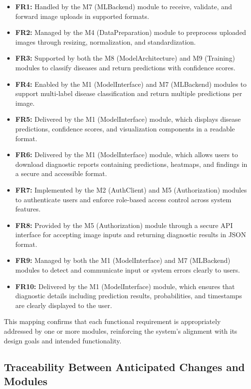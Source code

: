 \documentclass[12pt, titlepage]{article}
\begin{document}
\begin{itemize}
    \item \textbf{FR1:} Handled by the M7 (MLBackend) module to receive, validate, and forward image uploads in supported formats.
    \item \textbf{FR2:} Managed by the M4 (DataPreparation) module to preprocess uploaded images through resizing, normalization, and standardization.
    \item \textbf{FR3:} Supported by both the M8 (ModelArchitecture) and M9 (Training) modules to classify diseases and return predictions with confidence scores.
    \item \textbf{FR4:} Enabled by the M1 (ModelInterface) and M7 (MLBackend) modules to support multi-label disease classification and return multiple predictions per image.
    \item \textbf{FR5:} Delivered by the M1 (ModelInterface) module, which displays disease predictions, confidence scores, and visualization components in a readable format.
    \item \textbf{FR6:} Delivered by the M1 (ModelInterface) module, which allows users to download diagnostic reports containing predictions, heatmaps, and findings in a secure and accessible format.
    \item \textbf{FR7:} Implemented by the M2 (AuthClient) and M5 (Authorization) modules to authenticate users and enforce role-based access control across system features.
    \item \textbf{FR8:} Provided by the M5 (Authorization) module through a secure API interface for accepting image inputs and returning diagnostic results in JSON format.
    \item \textbf{FR9:} Managed by both the M1 (ModelInterface) and M7 (MLBackend) modules to detect and communicate input or system errors clearly to users.
    \item \textbf{FR10:} Delivered by the M1 (ModelInterface) module, which ensures that diagnostic details including prediction results, probabilities, and timestamps are clearly displayed to the user.
\end{itemize}

This mapping confirms that each functional requirement is appropriately addressed by one or more modules, reinforcing the system's alignment with its design goals and intended functionality.

\subsection{Traceability Between Anticipated Changes and Modules}
\end{document}
